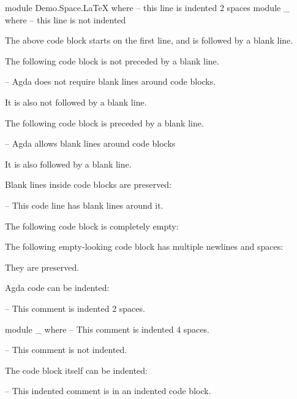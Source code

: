 \begin{code}
module Demo.Space.LaTeX
  where         -- this line is indented 2 spaces
module _ where  -- this line is not indented
\end{code}

The above code block starts on the first line, and is followed by a blank line.

The following code block is not preceded by a blank line.
\begin{code}
-- Agda does not require blank lines around code blocks.
\end{code}
It is also not followed by a blank line.

The following code block is preceded by a blank line.

\begin{code}
-- Agda allows blank lines around code blocks
\end{code}

It is also followed by a blank line.

Blank lines inside code blocks are preserved:

\begin{code}

-- This code line has blank lines around it.

\end{code}

The following code block is completely empty:

\begin{code}
\end{code}

The following empty-looking code block has multiple newlines and spaces:

\begin{code}
    
  
\end{code}

They are preserved.

Agda code can be indented:

\begin{code}
  -- This comment is indented 2 spaces.

  module _
    where
    -- This comment is indented 4 spaces.

-- This comment is not indented.
\end{code}

The code block itself can be indented:

  \begin{code}
  -- This indented comment is in an indented code block.
  \end{code}